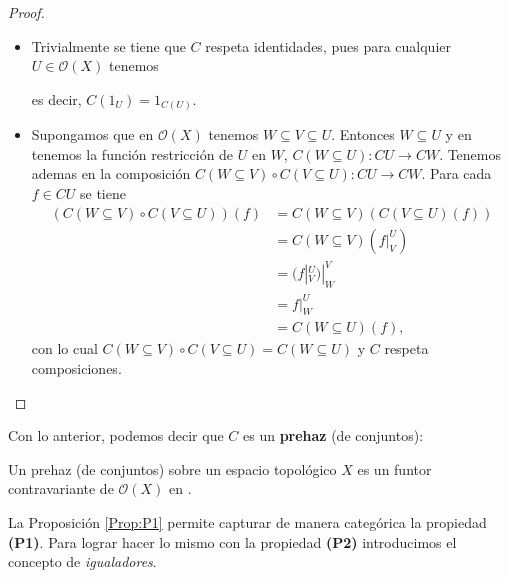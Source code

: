 \begin{proof}
   \begin{itemize}
      \item Trivialmente se tiene que $C$ respeta identidades, pues para cualquier $U\in\mathcal{O}(X)$ tenemos
         
         es decir, $C(1_U)=1_{C(U)}$.
      \item Supongamos que en $\mathcal{O}(X)$ tenemos $W\subseteq V\subseteq U$. Entonces $W\subseteq U$ y en  tenemos la función restricción de $U$ en $W$, $C(W\subseteq U):CU\to CW$. Tenemos ademas en  la composición $C(W\subseteq V)\circ C(V\subseteq U):CU\to CW$. Para cada $f\in CU$ se tiene
         $$
         \begin{aligned}
            (C(W\subseteq V)\circ C(V\subseteq U))(f)&=C(W\subseteq V)(C(V\subseteq U)(f))\\
                                                     &=C(W\subseteq V)(f|^U_V)\\
                                                     &=(f|^U_V)|^V_W\\
                                                     &=f|^U_W\\
                                                     &=C(W\subseteq U)(f),
         \end{aligned}
         $$
      con lo cual $C(W\subseteq V)\circ C(V\subseteq U) = C(W\subseteq U)$ y $C$ respeta composiciones.
      \end{itemize}
\end{proof}
Con lo anterior, podemos decir que $C$ es un \textbf{prehaz} (de conjuntos):
\begin{Def}[Prehaz]
   Un prehaz (de conjuntos) sobre un espacio topológico $X$ es un funtor contravariante de $\mathcal{O}(X)$ en .
\end{Def}
La Proposición \ref{Prop:P1} permite capturar de manera categórica la propiedad \textbf{(P1)}. Para lograr hacer lo mismo con la propiedad \textbf{(P2)} introducimos el concepto de \textit{igualadores}.
